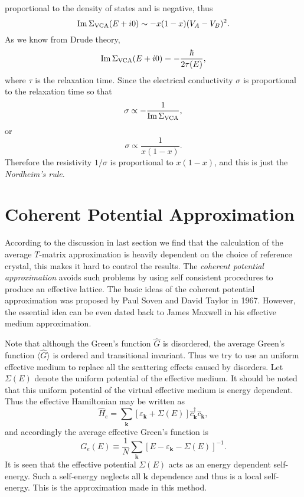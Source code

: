 \documentclass{book}
\newcommand{\average}[1]{\langle#1\rangle}
\renewcommand{\Im}{{\rm Im}}
\numberwithin{equation}{section}
\begin{document}
proportional to the density of states and is negative, thus
\begin{equation}
  \Im\,\Sigma_{\rm VCA}(E+i0)\sim -x(1-x)(V_A-V_B)^2.
\end{equation}
As we know from Drude theory, 
\begin{equation}
  \Im\,\Sigma_{\rm VCA}(E+i0)=-\frac{\hbar}{2\tau(E)},
\end{equation}
where $\tau$ is the relaxation time. Since the electrical conductivity
$\sigma$ is proportional to the relaxation time so that
\begin{equation}
  \sigma\propto -\frac{1}{\Im\,\Sigma_{\rm VCA}},
\end{equation}
or
\begin{equation}
  \sigma\propto \frac{1}{x(1-x)}.
\end{equation}
Therefore the resistivity $1/\sigma$ is proportional to $x(1-x)$, and
this is just the \textit{Nordheim's rule}. 

\section{Coherent Potential Approximation}

According to the discussion in last section we find that the
calculation of the average $T$-matrix approximation is heavily
dependent on the choice of reference crystal, this makes it hard to
control the results. The \textit{coherent potential approximation}
avoids such problems by using self consistent procedures to produce an
effective lattice. The basic ideas of the coherent potential
approximation was proposed by Paul Soven and David Taylor in
1967. However, the essential idea can be even dated back to James
Maxwell in his effective medium approximation.

Note that although the Green's function $\hat{G}$ is disordered, the
average Green's function $\average{\hat{G}}$ is ordered and
transitional invariant. Thus we try to use an uniform effective medium
to replace all the scattering effects caused by disorders. Let
$\Sigma(E)$ denote the uniform potential of the effective medium. It
should be noted that this uniform potential of the virtual effective
medium is energy dependent. Thus the effective Hamiltonian may be
written as
\begin{equation}
  \hat{H}_e=\sum_{\bm{k}}[\varepsilon_{\bm{k}}+\Sigma(E)]
  \hat{c}^\dagger_{\bm{k}}\hat{c}_{\bm{k}},
\end{equation}
and accordingly the average effective Green's function is
\begin{equation}
  \label{eq:effective-Green-function}
  G_e(E)\equiv\frac{1}{N}\sum_{\bm{k}}[E-\varepsilon_{\bm{k}}-\Sigma(E)]^{-1}.
\end{equation}
It is seen that the effective potential $\Sigma(E)$ acts as an energy
dependent self-energy. Such a self-energy neglects all $\bm{k}$
dependence and thus is a local self-energy. This is the approximation
made in this method.
\end{document}
